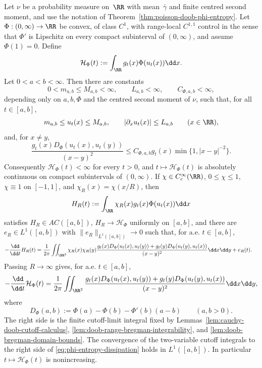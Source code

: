 \begin{proposition}%
\label{prop:doob-bregman-domain-closure}
Let $\nu$ be a probability measure on~$\RR$ with mean~$\bar{\gamma}$ and
finite centred second moment, and use the notation of
Theorem~\ref{thm:poisson-doob-phi-entropy}.  Let
$\Phi:(0,\infty)\to\RR$ be convex, of class $C^1$, with range-local
$C^{1,1}$ control in the sense that $\Phi'$ is Lipschitz on every compact
subinterval of $(0,\infty)$, and assume $\Phi(1)=0$.  Define
\[
\mathcal H_\Phi(t):=\int_{\RR}g_t(x)\Phi(u_t(x))\dd x .
\]
Let \(0<a<b<\infty\).  Then there are constants
\[
0<m_{a,b}\le M_{a,b}<\infty,\qquad L_{a,b}<\infty,\qquad
C_{\Phi,a,b}<\infty,
\]
depending only on \(a,b,\Phi\) and the centred second moment of \(\nu\), such
that, for all \(t\in[a,b]\),
\begin{equation}\label{eq:phi-domain-core-range}
m_{a,b}\le u_t(x)\le M_{a,b},\qquad
|\partial_xu_t(x)|\le L_{a,b}\qquad(x\in\RR),
\end{equation}
and, for \(x\ne y\),
\begin{equation}\label{eq:phi-domain-core-majorant}
\frac{g_t(x)D_\Phi(u_t(x),u_t(y))}{(x-y)^2}
\le C_{\Phi,a,b}g_t(x)\min\{1,|x-y|^{-2}\}.
\end{equation}
Consequently $\mathcal H_\Phi(t)<\infty$ for every $t>0$, and
$t\mapsto\mathcal H_\Phi(t)$ is absolutely continuous on compact
subintervals of $(0,\infty)$.  If
\(\chi\in C_c^\infty(\RR)\), \(0\le\chi\le1\), \(\chi\equiv1\) on
\([-1,1]\), and \(\chi_R(x)=\chi(x/R)\), then
\[
H_R(t):=\int_{\RR}\chi_R(x)g_t(x)\Phi(u_t(x))\dd x
\]
satisfies \(H_R\in AC([a,b])\), \(H_R\to\mathcal H_\Phi\) uniformly on
\([a,b]\), and there are \(e_R\in L^1([a,b])\) with
\(\|e_R\|_{L^1([a,b])}\to0\) such that, for a.e. \(t\in[a,b]\),
\begin{equation}\label{eq:phi-domain-localized-cutoff-balance}
\begin{split}
-\frac{\dd}{\dd t}H_R(t)
&=
\frac{1}{2\pi}\iint_{\RR^2}
\chi_R(x)\chi_R(y)
\frac{
g_t(x)D_\Phi(u_t(x),u_t(y))
+g_t(y)D_\Phi(u_t(y),u_t(x))}
{(x-y)^2}\dd x\dd y
+e_R(t).
\end{split}
\end{equation}
Passing \(R\to\infty\) gives, for a.e. \(t\in[a,b]\),
\begin{equation}\label{eq:phi-entropy-dissipation}
-\frac{\dd}{\dd t}\mathcal H_\Phi(t)
=
\frac{1}{2\pi}\iint_{\RR^2}
\frac{
g_t(x)D_\Phi(u_t(x),u_t(y))
+g_t(y)D_\Phi(u_t(y),u_t(x))}
{(x-y)^2}\dd x\dd y,
\end{equation}
where
\[
D_\Phi(a,b):=\Phi(a)-\Phi(b)-\Phi'(b)(a-b)
\qquad(a,b>0).
\]
The right side is the finite cutoff-limit integral fixed by
Lemmas~\ref{lem:cauchy-doob-cutoff-calculus},
\ref{lem:doob-range-bregman-integrability}, and
\ref{lem:doob-bregman-domain-bounds}.  The convergence of the two-variable
cutoff integrals to the right side of \eqref{eq:phi-entropy-dissipation}
holds in \(L^1([a,b])\).  In particular \(t\mapsto\mathcal H_\Phi(t)\) is
nonincreasing.
\end{proposition}

